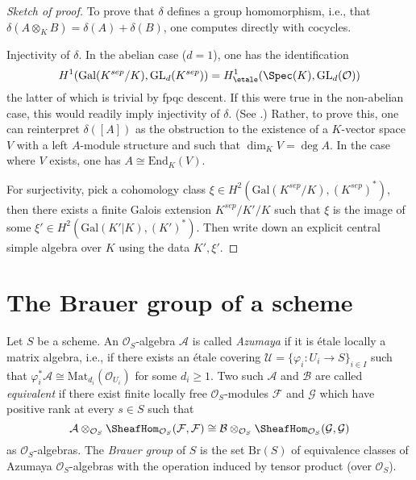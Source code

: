 \begin{proof}[Sketch of proof]
To prove that $\delta$ defines a group homomorphism, i.e., that
$\delta(A \otimes_K B) = \delta(A) + \delta(B)$, one computes
directly with cocycles.

\medskip\noindent
Injectivity of $\delta$. In the abelian case ($d = 1$), one has the
identification
$$
H^1(\text{Gal}(K^{sep}/K), \text{GL}_d(K^{sep})) =
H_\etale^1(\Spec(K), \text{GL}_d(\mathcal{O}))
$$
the latter of which is trivial by fpqc descent. If this were true in the
non-abelian case, this would readily imply injectivity of $\delta$. (See
\cite{SGA4.5}.) Rather, to prove this, one can reinterpret $\delta([A])$ as the
obstruction to the existence of a $K$-vector space $V$ with a left $A$-module
structure and such that $\dim_K V = \deg A$. In the case where $V$ exists, one
has $A \cong \text{End}_K(V)$.

\medskip\noindent
For surjectivity, pick a
cohomology class $\xi \in H^2(\text{Gal}(K^{sep}/K), (K^{sep})^*)$,
then there exists a finite Galois extension $K^{sep}/K'/K$
such that $\xi$ is the image of some
$\xi' \in H^2(\text{Gal}(K'|K), (K')^*)$. Then write
down an explicit central simple algebra over $K$ using the data $K', \xi'$.
\end{proof}










\section{The Brauer group of a scheme}
\label{section-brauer-scheme}

\noindent
Let $S$ be a scheme. An $\mathcal{O}_S$-algebra
$\mathcal{A}$ is called {\it Azumaya} if it is \'etale locally a matrix
algebra, i.e., if there exists an \'etale covering
$\mathcal{U} = \{ \varphi_i : U_i \to S\}_{i \in I}$ such that
$\varphi_i^*\mathcal{A} \cong \text{Mat}_{d_i}(\mathcal{O}_{U_i})$
for some $d_i \geq 1$. Two such
$\mathcal{A}$ and $\mathcal{B}$ are called {\it equivalent} if there exist
finite locally free $\mathcal{O}_S$-modules $\mathcal{F}$ and $\mathcal{G}$
which have positive rank at every $s \in S$ such that
$$
\mathcal{A} \otimes_{\mathcal{O}_S}
\SheafHom_{\mathcal{O}_S}(\mathcal{F}, \mathcal{F})
\cong
\mathcal{B} \otimes_{\mathcal{O}_S}
\SheafHom_{\mathcal{O}_S}(\mathcal{G}, \mathcal{G})
$$
as $\mathcal{O}_S$-algebras. The {\it Brauer group} of
$S$ is the set $\text{Br}(S)$ of equivalence classes of Azumaya
$\mathcal{O}_S$-algebras with the operation induced by tensor product (over
$\mathcal{O}_S$).


